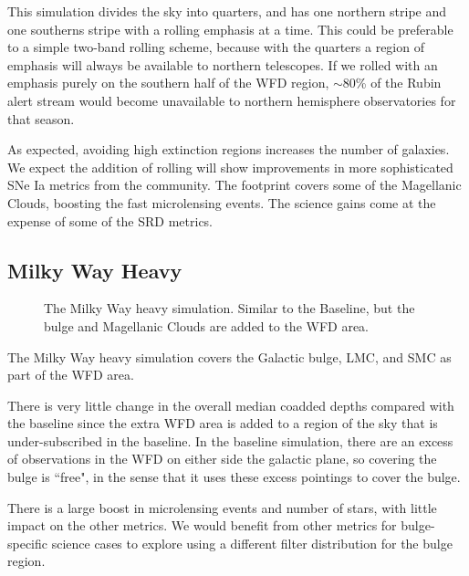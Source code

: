 This simulation divides the sky into quarters, and has one northern stripe and one southerns stripe with a rolling emphasis at a time. This could be preferable to a simple two-band rolling scheme, because with the quarters a region of emphasis will always be available to northern telescopes. If we rolled with an emphasis purely on the southern half of the WFD region, $\sim$80\% of the Rubin alert stream would become unavailable to northern hemisphere observatories for that season.

As expected, avoiding high extinction regions increases the number of galaxies. We expect the addition of rolling will show improvements in more sophisticated SNe Ia metrics from the community. The footprint covers some of the Magellanic Clouds, boosting the fast microlensing events.  The science gains come at the expense of some of the SRD metrics. 

\subsection{Milky Way Heavy}\label{ss:1.6milkywayheavy}
\begin{figure}
\caption{The Milky Way heavy simulation. Similar to the Baseline, but the bulge and Magellanic Clouds are added to the WFD area. }\label{fig:mwheavy}
\end{figure}

The Milky Way heavy simulation covers the Galactic bulge, LMC, and SMC as part of the WFD area.  

There is very little change in the overall median coadded depths compared with the baseline since the extra WFD area is added to a region of the sky that is under-subscribed in the baseline.  In the baseline simulation, there are an excess of observations in the WFD on either side the galactic plane, so covering the bulge is ``free", in the sense that it uses these excess pointings to cover the bulge. 

There is a large boost in microlensing events and number of stars, with little impact on the other metrics. We would benefit from other metrics for bulge-specific science cases to explore using a different filter distribution for the bulge region.


